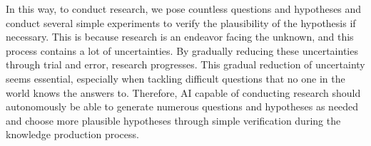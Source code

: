 In this way, to conduct research, we pose countless questions and hypotheses and conduct several simple  experiments to verify the plausibility of the hypothesis if necessary. This is because research is an endeavor facing the unknown, and this process contains a lot of uncertainties. By gradually reducing these uncertainties through trial and error, research progresses. This gradual reduction of uncertainty seems essential, especially when tackling difficult questions that no one in the world knows the answers to. Therefore, AI capable of conducting research should autonomously be able to generate numerous questions and hypotheses as needed and choose more plausible hypotheses through simple verification during the knowledge production process.






